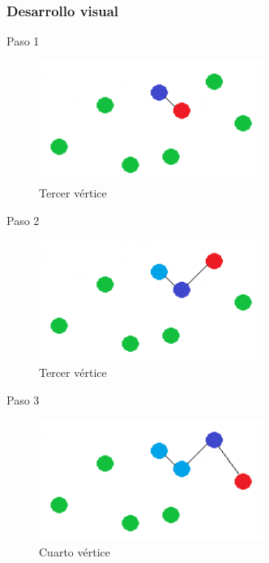 \subsubsection{Desarrollo visual}
\begin{frame}
	\begin{exampleblock}{Paso 1}
	\begin{figure}[htbH]
		\centering
		\includegraphics[width=0.65\textwidth]{./Imagenes/vecino1.png}
		\caption{Tercer vértice}
	\end{figure}
	\end{exampleblock}
\end{frame}

\begin{frame}
	\begin{exampleblock}{Paso 2}
	\begin{figure}[htbH]
		\centering
		\includegraphics[width=0.65\textwidth]{./Imagenes/vecino2.png}
		\caption{Tercer vértice}
	\end{figure}
	\end{exampleblock}
\end{frame}

\begin{frame}
	\begin{exampleblock}{Paso 3}
	\begin{figure}[htbH]
		\centering
		\includegraphics[width=0.65\textwidth]{./Imagenes/vecino3.png}
		\caption{Cuarto vértice}
	\end{figure}
	\end{exampleblock}
\end{frame}



